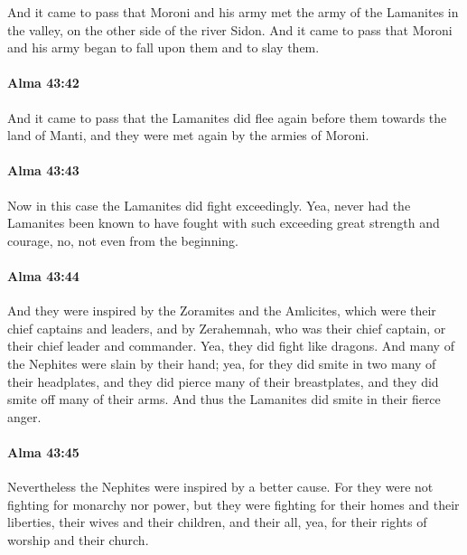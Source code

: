 			And it came to pass that
			Moroni and his army met the army of the Lamanites in the valley,
			on the other side of the river Sidon.
			And it came to pass that
			Moroni and his army began to fall upon them and to slay them.

		\paragraph{Alma 43:42} %
			\label{ALMA-43-42}

			And it came to pass that
			the Lamanites did flee again before them towards the land of Manti,
			and they were met again by the armies of Moroni.

		\paragraph{Alma 43:43} %
			\label{ALMA-43-43}

			Now in this case the Lamanites did fight exceedingly.
			Yea, never had the Lamanites been known
			to have fought with such exceeding great strength and courage,
			no, not even from the beginning.

		\paragraph{Alma 43:44} %
			\label{ALMA-43-44}

			And they were inspired by the Zoramites and the Amlicites,
			which were their chief captains and leaders,
			and by Zerahemnah,
			who was their chief captain, or their chief leader and commander.
			Yea, they did fight like dragons.
			And many of the Nephites were slain by their hand;
			yea, for they did smite in two many of their headplates,
			and they did pierce many of their breastplates,
			and they did smite off many of their arms.
			And thus the Lamanites did smite in their fierce anger.

		\paragraph{Alma 43:45} %
			\label{ALMA-43-45}

			Nevertheless the Nephites were inspired by a better cause.
			For they were not fighting for monarchy nor power,
			but they were fighting for their homes and their liberties,
			their wives and their children, and their all,
			yea, for their rights of worship and their church.


